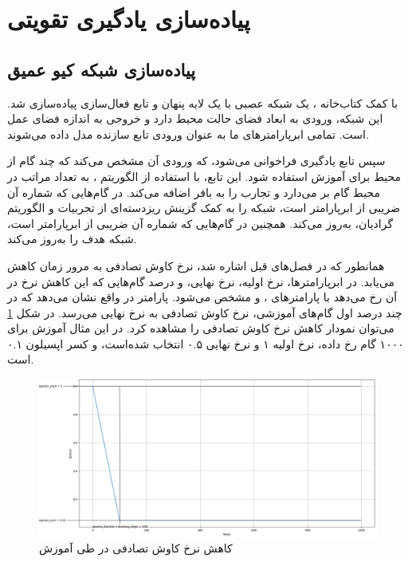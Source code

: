 \section{پیاده‌سازی یادگیری تقویتی}
\subsection{پیاده‌سازی شبکه کیو عمیق}
با کمک کتاب‌خانه ،
یک شبکه عصبی با یک لایه پنهان و تابع فعال‌سازی  پیاده‌سازی شد.
این شبکه، ورودی به ابعاد فضای حالت محیط دارد و خروجی به اندازه فضای عمل است.
تمامی ابرپارامتر‌های ما به عنوان ورودی تابع سازنده مدل داده می‌شوند.

سپس تابع یادگیری فراخوانی می‌شود، که ورودی آن مشخص می‌کند که چند گام از محیط برای آموزش استفاده شود.
این تابع، با استفاده از الگوریتم ،
به تعداد مراتب در محیط گام بر می‌دارد و تجارب را به بافر اضافه می‌کند. در گام‌هایی که شماره آن ضریبی از ابرپارامتر  است،
شبکه را به کمک گزینش ریزدسته‌ای از تجربیات و الگوریتم گرادیان، به‌روز می‌کند.
همچنین در گام‌هایی که شماره آن ضریبی از ابرپارامتر  است،
شبکه هدف را به‌روز می‌کند.

همانطور که در فصل‌های قبل اشاره شد، نرخ کاوش تصادفی به مرور زمان کاهش می‌یابد.
در ابرپارامتر‌ها، نرخ اولیه، نرخ نهایی، و درصد گام‌هایی که این کاهش نرخ در آن رخ می‌دهد با 
پارامتر‌های ،  و  مشخص می‌شود.
پارامتر  در واقع نشان می‌دهد که در چند درصد اول گام‌های آموزشی، نرخ کاوش تصادفی به نرخ نهایی می‌رسد.
در شکل \ref{fig:epsilon_decay} می‌توان نمودار کاهش نرخ کاوش تصادفی را مشاهده کرد.
در این مثال آموزش برای ۱۰۰۰ گام رخ داده، نرخ اولیه ۱ و نرخ نهایی ۰.۵ انتخاب شده‌است، و کسر اپسیلون
 ۰.۱ است.
\begin{figure}[H]
    \centering
    \includegraphics[width=1.1\textwidth]{images/epsilon_decay_2.png}
    \caption{کاهش نرخ کاوش تصادفی در طی آموزش}\label{fig:epsilon_decay}
\end{figure}

